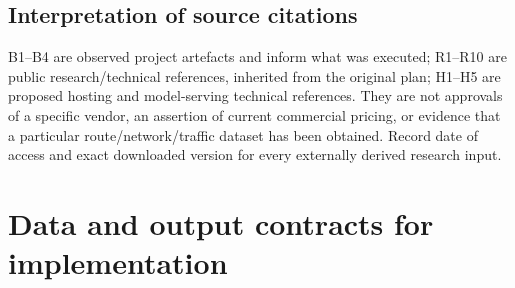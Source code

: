 \documentclass[11pt,a4paper,openany]{report}
\begin{document}
\section{Interpretation of source citations}
B1--B4 are observed project artefacts and inform what was executed; R1--R10 are public research/technical references, inherited from the original plan; H1--H5 are proposed hosting and model-serving technical references. They are not approvals of a specific vendor, an assertion of current commercial pricing, or evidence that a particular route/network/traffic dataset has been obtained. Record date of access and exact downloaded version for every externally derived research input.

\chapter{Data and output contracts for implementation}
\end{document}
